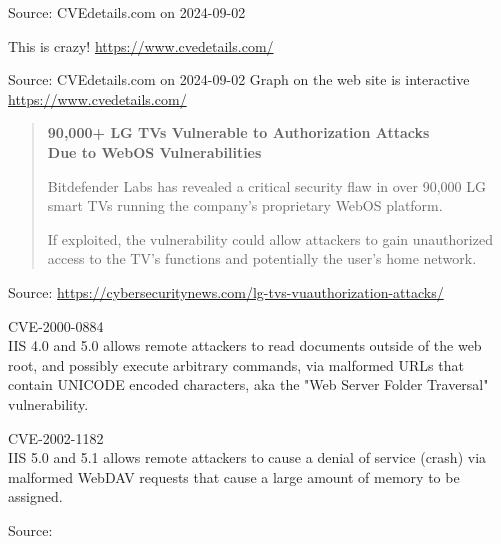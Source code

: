 \documentclass[Screen16to9,17pt]{foils}
\begin{document}

Source: CVEdetails.com on 2024-09-02

\begin{list2}
\item This is crazy! \url{https://www.cvedetails.com/}
\end{list2}


Source: CVEdetails.com on 2024-09-02 Graph on the web site is interactive \url{https://www.cvedetails.com/}



\begin{quote}{\large\bf
90,000+ LG TVs Vulnerable to Authorization Attacks\\
Due to WebOS Vulnerabilities}

Bitdefender Labs has revealed a critical security flaw in over 90,000 LG smart TVs running the company’s proprietary WebOS platform.

If exploited, the vulnerability could allow attackers to gain unauthorized access to the TV’s functions and potentially the user’s home network.

\end{quote}
Source: \url{https://cybersecuritynews.com/lg-tvs-vuauthorization-attacks/}




\begin{list1}
\item \small CVE-2000-0884\\
IIS 4.0 and 5.0 allows remote attackers to read documents outside of
the web root, and possibly execute arbitrary commands, via malformed
URLs that contain UNICODE encoded characters, aka the "Web Server
Folder Traversal" vulnerability.

\item \small CVE-2002-1182\\
IIS 5.0 and 5.1 allows remote attackers to cause a denial of service
(crash) via malformed WebDAV requests that cause a large amount of
memory to be assigned.

\item Source:\\
\end{list1}
\end{document}
